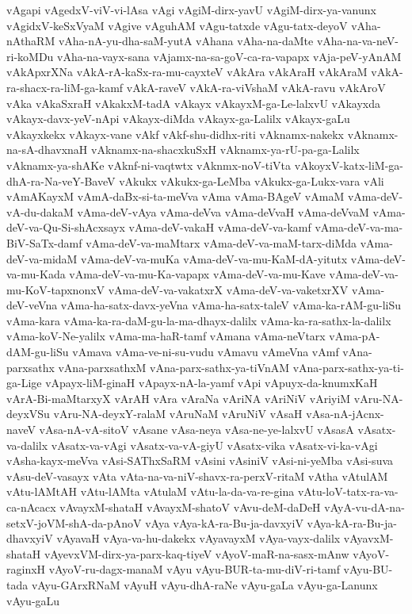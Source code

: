 {vAgapi
vAgedxV-viV-vi-lAsa
vAgi
vAgiM-dirx-yavU
vAgiM-dirx-ya-vanunx
vAgidxV-keSxVyaM
vAgive
vAguhAM
vAgu-tatxde
vAgu-tatx-deyoV
vAha-nAthaRM
vAha-nA-yu-dha-saM-yutA
vAhana
vAha-na-daMte
vAha-na-va-neV-ri-koMDu
vAha-na-vayx-sana
vAjamx-na-sa-goV-ca-ra-vapapx
vAja-peV-yAnAM
vAkApxrXNa
vAkA-rA-kaSx-ra-mu-cayxteV
vAkAra
vAkAraH
vAkAraM
vAkA-ra-shacx-ra-liM-ga-kamf
vAkA-raveV
vAkA-ra-viVshaM
vAkA-ravu
vAkAroV
vAka
vAkaSxraH
vAkakxM-tadA
vAkayx
vAkayxM-ga-Le-lalxvU
vAkayxda
vAkayx-davx-yeV-nApi
vAkayx-diMda
vAkayx-ga-Lalilx
vAkayx-gaLu
vAkayxkekx
vAkayx-vane
vAkf
vAkf-shu-didhx-riti
vAknamx-nakekx
vAknamx-na-sA-dhavxnaH
vAknamx-na-shacxkuSxH
vAknamx-ya-rU-pa-ga-Lalilx
vAknamx-ya-shAKe
vAknf-ni-vaqtwtx
vAknmx-noV-tiVta
vAkoyxV-katx-liM-ga-dhA-ra-Na-veY-BaveV
vAkukx
vAkukx-ga-LeMba
vAkukx-ga-Lukx-vara
vAli
vAmAKayxM
vAmA-daBx-si-ta-meVva
vAma
vAma-BAgeV
vAmaM
vAma-deV-vA-du-dakaM
vAma-deV-vAya
vAma-deVva
vAma-deVvaH
vAma-deVvaM
vAma-deV-va-Qu-Si-shAcxsayx
vAma-deV-vakaH
vAma-deV-va-kamf
vAma-deV-va-ma-BiV-SaTx-damf
vAma-deV-va-maMtarx
vAma-deV-va-maM-tarx-diMda
vAma-deV-va-midaM
vAma-deV-va-muKa
vAma-deV-va-mu-KaM-dA-yitutx
vAma-deV-va-mu-Kada
vAma-deV-va-mu-Ka-vapapx
vAma-deV-va-mu-Kave
vAma-deV-va-mu-KoV-tapxnonxV
vAma-deV-va-vakatxrX
vAma-deV-va-vaketxrXV
vAma-deV-veVna
vAma-ha-satx-davx-yeVna
vAma-ha-satx-taleV
vAma-ka-rAM-gu-liSu
vAma-kara
vAma-ka-ra-daM-gu-la-ma-dhayx-dalilx
vAma-ka-ra-sathx-la-dalilx
vAma-koV-Ne-yalilx
vAma-ma-haR-tamf
vAmana
vAma-neVtarx
vAma-pA-dAM-gu-liSu
vAmava
vAma-ve-ni-su-vudu
vAmavu
vAmeVna
vAmf
vAna-parxsathx
vAna-parxsathxM
vAna-parx-sathx-ya-tiVnAM
vAna-parx-sathx-ya-ti-ga-Lige
vApayx-liM-ginaH
vApayx-nA-la-yamf
vApi
vApuyx-da-knumxKaH
vArA-Bi-maMtarxyX
vArAH
vAra
vAraNa
vAriNA
vAriNiV
vAriyiM
vAru-NA-deyxVSu
vAru-NA-deyxY-ralaM
vAruNaM
vAruNiV
vAsaH
vAsa-nA-jAcnx-naveV
vAsa-nA-vA-sitoV
vAsane
vAsa-neya
vAsa-ne-ye-lalxvU
vAsasA
vAsatx-va-dalilx
vAsatx-va-vAgi
vAsatx-va-vA-giyU
vAsatx-vika
vAsatx-vi-ka-vAgi
vAsha-kayx-meVva
vAsi-SAThxSaRM
vAsini
vAsiniV
vAsi-ni-yeMba
vAsi-suva
vAsu-deV-vasayx
vAta
vAta-na-va-niV-shavx-ra-perxV-ritaM
vAtha
vAtulAM
vAtu-lAMtAH
vAtu-lAMta
vAtulaM
vAtu-la-da-va-re-gina
vAtu-loV-tatx-ra-va-ca-nAcacx
vAvayxM-shataH
vAvayxM-shatoV
vAvu-deM-daDeH
vAyA-vu-dA-na-setxV-joVM-shA-da-pAnoV
vAya
vAya-kA-ra-Bu-ja-davxyiV
vAya-kA-ra-Bu-ja-dhavxyiV
vAyavaH
vAya-va-hu-dakekx
vAyavayxM
vAya-vayx-dalilx
vAyavxM-shataH
vAyevxVM-dirx-ya-parx-kaq-tiyeV
vAyoV-maR-na-sasx-mAnw
vAyoV-raginxH
vAyoV-ru-dagx-manaM
vAyu
vAyu-BUR-ta-mu-diV-ri-tamf
vAyu-BU-tada
vAyu-GArxRNaM
vAyuH
vAyu-dhA-raNe
vAyu-gaLa
vAyu-ga-Lanunx
vAyu-gaLu
}
